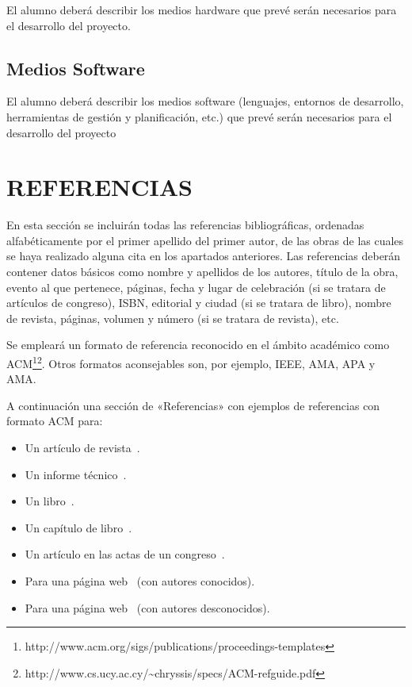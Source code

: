 \documentclass{pre-tfg}
\begin{document}
El alumno deberá describir los medios hardware que prevé serán necesarios para el
desarrollo del proyecto.


\subsection{Medios Software}

El alumno deberá describir los medios software (lenguajes, entornos de desarrollo,
herramientas de gestión y planificación, etc.) que prevé serán necesarios para el
desarrollo del proyecto

\newpage

\section{REFERENCIAS}

En esta sección se incluirán todas las referencias bibliográficas, ordenadas
alfabéticamente por el primer apellido del primer autor, de las obras de las cuales se
haya realizado alguna cita en los apartados anteriores. Las referencias deberán contener
datos básicos como nombre y apellidos de los autores, título de la obra, evento al que
pertenece, páginas, fecha y lugar de celebración (si se tratara de artículos de congreso),
ISBN, editorial y ciudad (si se tratara de libro), nombre de revista, páginas, volumen y
número (si se tratara de revista), etc.

Se empleará un formato de referencia reconocido en el ámbito académico como
ACM\footnote{http://www.acm.org/sigs/publications/proceedings-templates}\footnote{http://www.cs.ucy.ac.cy/\~{}chryssis/specs/ACM-refguide.pdf}.
Otros formatos aconsejables son, por ejemplo, IEEE, AMA, APA y AMA.

A continuación una sección de «Referencias» con ejemplos de referencias con formato ACM para:

\begin{itemize}
\item Un artículo de revista~\cite{Bow93}.
\item Un informe técnico~\cite{Ding97}.
\item Un libro~\cite{Tavel07}.
\item Un capítulo de libro~\cite{Greiner99}.
\item Un artículo en las actas de un congreso~\cite{Frohlic00}.
\item Para una página web~\cite{Steele04} (con autores conocidos).
\item Para una página web~\cite{Oxygen} (con autores desconocidos).
\end{itemize}
\end{document}
